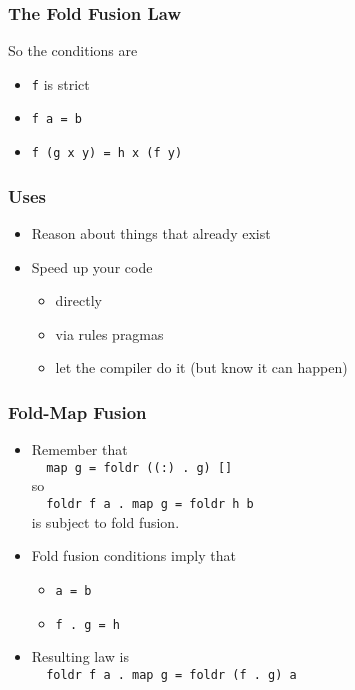 \documentclass{beamer}
\begin{document}
\begin{frame}[fragile]
    \frametitle{The Fold Fusion Law}

So the conditions are
\begin{itemize}
    \item \verb?f? is strict\\
    \item \verb?f a = b?\\
    \item \verb?f (g x y) = h x (f y)?\\
\end{itemize}

\end{frame}

\begin{frame}
    \frametitle{Uses}

\begin{itemize}
    \item Reason about things that already exist
    \item Speed up your code
    \begin{itemize}
        \item directly
        \item via rules pragmas
        \item let the compiler do it (but know it can happen)
    \end{itemize}
\end{itemize}

\end{frame}

\begin{frame}[fragile]
    \frametitle{Fold-Map Fusion}

\begin{itemize}
    \item Remember that \\
    \verb?  map g = foldr ((:) . g) []?\\
    so \\
    \verb?  foldr f a . map g = foldr h b?\\
    is subject to fold fusion.
    \item Fold fusion conditions imply that
    \begin{itemize}
        \item \verb?a = b?
        \item \verb?f . g = h?
    \end{itemize}
    \item Resulting law is \\
    \verb?  foldr f a . map g = foldr (f . g) a?
\end{itemize}

\end{frame}
\end{document}
